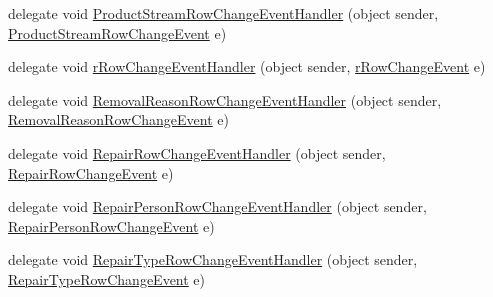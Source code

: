 \begin{DoxyCompactItemize}
delegate void \hyperlink{class_env_int_1_1_win32_1_1_field_tech_1_1_manager_1_1_data_sets_1_1_guide_ware_mobile_data_set_ad25fd90b16b6b963a1d750a75c2e32a3}{Product\+Stream\+Row\+Change\+Event\+Handler} (object sender, \hyperlink{class_env_int_1_1_win32_1_1_field_tech_1_1_manager_1_1_data_sets_1_1_guide_ware_mobile_data_set_6d119e1ef5d2632a57332691de4d53e9}{Product\+Stream\+Row\+Change\+Event} e)
\item 
delegate void \hyperlink{class_env_int_1_1_win32_1_1_field_tech_1_1_manager_1_1_data_sets_1_1_guide_ware_mobile_data_set_a827f75a235c1aff22fb429089a4ebdb5}{r\+Row\+Change\+Event\+Handler} (object sender, \hyperlink{class_env_int_1_1_win32_1_1_field_tech_1_1_manager_1_1_data_sets_1_1_guide_ware_mobile_data_set_1_1r_row_change_event}{r\+Row\+Change\+Event} e)
\item 
delegate void \hyperlink{class_env_int_1_1_win32_1_1_field_tech_1_1_manager_1_1_data_sets_1_1_guide_ware_mobile_data_set_a9e8d3bdd1299c308c92a189d287e41cc}{Removal\+Reason\+Row\+Change\+Event\+Handler} (object sender, \hyperlink{class_env_int_1_1_win32_1_1_field_tech_1_1_manager_1_1_data_sets_1_1_guide_ware_mobile_data_set_deb38dea927d9374a60c90d1719a477f}{Removal\+Reason\+Row\+Change\+Event} e)
\item 
delegate void \hyperlink{class_env_int_1_1_win32_1_1_field_tech_1_1_manager_1_1_data_sets_1_1_guide_ware_mobile_data_set_a5a18a00a70efa6bcaef5991835432d89}{Repair\+Row\+Change\+Event\+Handler} (object sender, \hyperlink{class_env_int_1_1_win32_1_1_field_tech_1_1_manager_1_1_data_sets_1_1_guide_ware_mobile_data_set_1_1_repair_row_change_event}{Repair\+Row\+Change\+Event} e)
\item 
delegate void \hyperlink{class_env_int_1_1_win32_1_1_field_tech_1_1_manager_1_1_data_sets_1_1_guide_ware_mobile_data_set_ab1d968fc848ee5de7b5a0eeeb994bdc7}{Repair\+Person\+Row\+Change\+Event\+Handler} (object sender, \hyperlink{class_env_int_1_1_win32_1_1_field_tech_1_1_manager_1_1_data_sets_1_1_guide_ware_mobile_data_set_9c921e67e64bbad224f4e7d364257dc3}{Repair\+Person\+Row\+Change\+Event} e)
\item 
delegate void \hyperlink{class_env_int_1_1_win32_1_1_field_tech_1_1_manager_1_1_data_sets_1_1_guide_ware_mobile_data_set_a9f766443fb197a07ea703f54c2a73232}{Repair\+Type\+Row\+Change\+Event\+Handler} (object sender, \hyperlink{class_env_int_1_1_win32_1_1_field_tech_1_1_manager_1_1_data_sets_1_1_guide_ware_mobile_data_set_86bb317b23e29e52c68c56fabaaadc6a}{Repair\+Type\+Row\+Change\+Event} e)
\item 

\end{DoxyCompactItemize}
